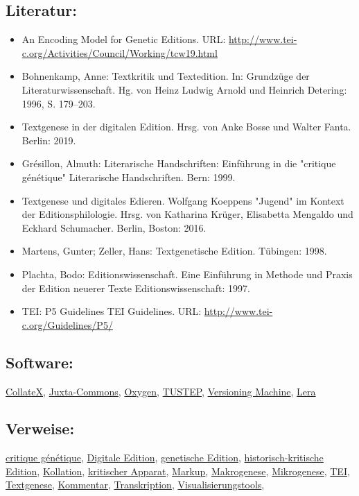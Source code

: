 \documentclass{article}
\begin{document}
        \subsection*{Literatur:}\begin{itemize}\item An Encoding Model for Genetic Editions. URL: \url{http://www.tei-c.org/Activities/Council/Working/tcw19.html}\item Bohnenkamp, Anne: Textkritik und Textedition. In: Grundzüge der Literaturwissenschaft. Hg. von Heinz Ludwig Arnold und Heinrich Detering: 1996, S. 179–203.\item Textgenese in der digitalen Edition. Hrsg. von Anke Bosse und Walter Fanta. Berlin: 2019.\item Grésillon, Almuth: Literarische Handschriften: Einführung in die "critique génétique" Literarische Handschriften. Bern: 1999.\item Textgenese und digitales Edieren. Wolfgang Koeppens "Jugend" im Kontext der Editionsphilologie. Hrsg. von Katharina Krüger, Elisabetta Mengaldo und Eckhard Schumacher. Berlin, Boston: 2016.\item Martens, Gunter; Zeller, Hans: Textgenetische Edition. Tübingen: 1998.\item Plachta, Bodo: Editionswissenschaft. Eine Einführung in Methode und Praxis der Edition neuerer Texte Editionswissenschaft: 1997.\item TEI: P5 Guidelines TEI Guidelines. URL: \url{http://www.tei-c.org/Guidelines/P5/}\end{itemize}\subsection*{Software:}\href{https://collatex.net}{CollateX}, \href{http://juxtacommons.org}{Juxta-Commons}, \href{http://oxygenxml.com/}{Oxygen}, \href{http://www.tustep.uni-tuebingen.de/}{TUSTEP}, \href{http://v-machine.org/}{Versioning Machine}, \href{http://lera.uzi.uni-halle.de}{Lera}\subsection*{Verweise:}\href{https://gams.uni-graz.at/o:konde.46}{critique génétique}, \href{https://gams.uni-graz.at/o:konde.59}{Digitale Edition}, \href{https://gams.uni-graz.at/o:konde.90}{genetische Edition}, \href{https://gams.uni-graz.at/o:konde.93}{historisch-kritische Edition}, \href{https://gams.uni-graz.at/o:konde.105}{Kollation}, \href{https://gams.uni-graz.at/o:konde.32}{kritischer Apparat}, \href{https://gams.uni-graz.at/o:konde.126}{Markup}, \href{https://gams.uni-graz.at/o:konde.23}{Makrogenese}, \href{https://gams.uni-graz.at/o:konde.26}{Mikrogenese}, \href{https://gams.uni-graz.at/o:konde.178}{TEI}, \href{https://gams.uni-graz.at/o:konde.28}{Textgenese}, \href{https://gams.uni-graz.at/o:konde.34}{Kommentar}, \href{https://gams.uni-graz.at/o:konde.197}{Transkription}, \href{https://gams.uni-graz.at/o:konde.210}{Visualisierungstools}, 
\end{document}
